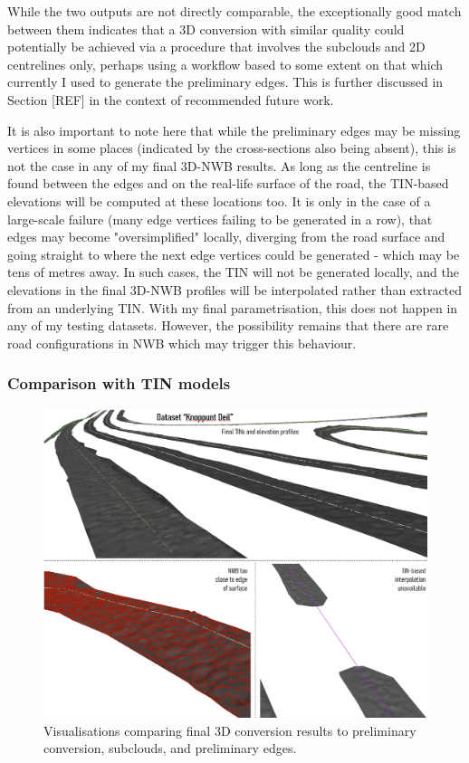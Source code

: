 While the two outputs are not directly comparable, the exceptionally good match between them indicates that a 3D conversion with similar quality could potentially be achieved via a procedure that involves the subclouds and 2D centrelines only, perhaps using a workflow based to some extent on that which currently I used to generate the preliminary edges. This is further discussed in Section [REF] in the context of recommended future work.

It is also important to note here that while the preliminary edges may be missing vertices in some places (indicated by the cross-sections also being absent), this is not the case in any of my final 3D-NWB results. As long as the centreline is found between the edges and on the real-life surface of the road, the TIN-based elevations will be computed at these locations too. It is only in the case of a large-scale failure (many edge vertices failing to be generated in a row), that edges may become "oversimplified" locally, diverging from the road surface and going straight to where the next edge vertices could be generated - which may be tens of metres away. In such cases, the TIN will not be generated locally, and the elevations in the final 3D-NWB profiles will be interpolated rather than extracted from an underlying TIN. With my final parametrisation, this does not happen in any of my testing datasets. However, the possibility remains that there are rare road configurations in NWB which may trigger this behaviour.

\subsubsection{Comparison with TIN models}

\begin{figure}[]
    \centering
    \includegraphics[width=0.9\linewidth]{final_report/figs/elevationinterpolation1.png}
    \caption{Visualisations comparing final 3D conversion results to preliminary conversion, subclouds, and preliminary edges.}
    \label{fig:elevationinterpolation0}
\end{figure}

